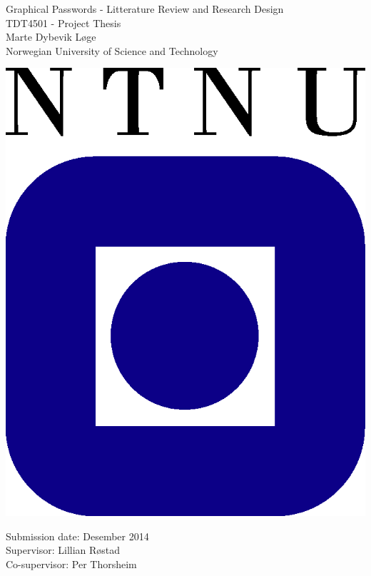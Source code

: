 \begin{titlepage}
\begin{center}

	{\Huge Graphical Passwords - Litterature Review and Research Design} \\[0.4cm]


	{\Large TDT4501 - Project Thesis} \\[2.0cm]
	{\Large Marte Dybevik Løge} \\ [0.5cm]
	{\Large Norwegian University of Science and Technology}\\

	\vspace{3.0cm}

			\includegraphics{pics/ntnu-logo2.png}

	\vspace{3.0cm}

	{\Large Submission date: Desember 2014} \\[0.2cm]
	{\Large Supervisor: Lillian Røstad} \\ [0.2cm]
	{\Large Co-supervisor: Per Thorsheim} \\ [0.2cm]
	
\end{center}
\end{titlepage}